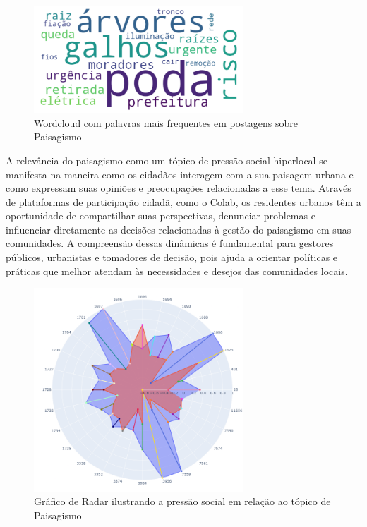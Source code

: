\begin{figure}[htb]
	\centering
	\includegraphics[width=0.7\textwidth]{images/wordcloud_landscape.png}
	\caption{Wordcloud com palavras mais frequentes em postagens sobre Paisagismo}
	\label{fig:wordcloud_landscape}
\end{figure}

A relevância do paisagismo como um tópico de pressão social hiperlocal se manifesta na maneira como os cidadãos interagem com a sua paisagem urbana e como expressam suas opiniões e preocupações relacionadas a esse tema. Através de plataformas de participação cidadã, como o Colab, os residentes urbanos têm a oportunidade de compartilhar suas perspectivas, denunciar problemas e influenciar diretamente as decisões relacionadas à gestão do paisagismo em suas comunidades. A compreensão dessas dinâmicas é fundamental para gestores públicos, urbanistas e tomadores de decisão, pois ajuda a orientar políticas e práticas que melhor atendam às necessidades e desejos das comunidades locais.

\begin{figure}[htb]
	\centering
	\includegraphics[width=0.7\textwidth]{images/social_barometer_landscape.png}
	\caption{Gráfico de Radar ilustrando a pressão social em relação ao tópico de Paisagismo}
	\label{fig:social_barometer_landscape}
\end{figure}

